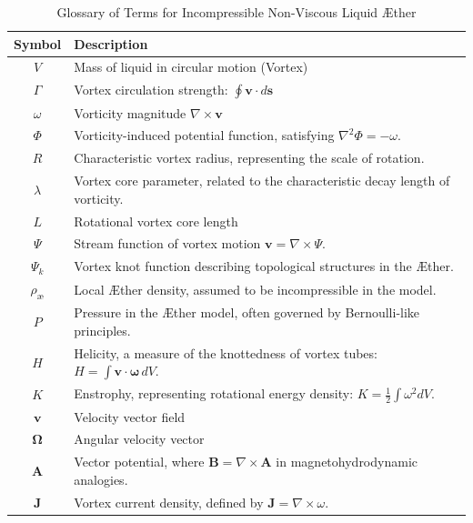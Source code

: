 \documentclass[a4paper,10pt]{article}
\renewcommand{\arraystretch}{1.5}
\begin{document}
    \begin{table}[htbp]
        \centering
        \renewcommand{\arraystretch}{1.0}
        \begin{tabular}{c l}
            \toprule
            Symbol & Description \\
            \midrule
            \( V \) & Mass of liquid in circular motion (Vortex) \\
            \( \Gamma \) & Vortex circulation strength: \( \oint \mathbf{v} \cdot d\mathbf{s} \) \\
            \( \omega \) & Vorticity magnitude \(\nabla \times \mathbf{v} \) \\
            \( \Phi \) & Vorticity-induced potential function, satisfying \( \nabla^2 \Phi = -\omega \). \\
            \( R \) & Characteristic vortex radius, representing the scale of rotation. \\
            \( \lambda \) & Vortex core parameter, related to the characteristic decay length of vorticity. \\
            \( L \) & Rotational vortex core length \\
            \( \Psi \) & Stream function of vortex motion \( \mathbf{v} = \nabla \times \Psi \). \\
            \( \Psi_k \) & Vortex knot function describing topological structures in the Æther. \\
            \( \rho_\text{\ae} \) & Local Æther density, assumed to be incompressible in the model. \\
            \( P \) & Pressure in the Æther model, often governed by Bernoulli-like principles. \\
            \( H \) & Helicity, a measure of the knottedness of vortex tubes: \( H = \int \mathbf{v} \cdot \mathbf{\omega} \, dV \). \\
            \( K \) & Enstrophy, representing rotational energy density: \( K = \frac{1}{2} \int \omega^2 dV \). \\
            \( \mathbf{v} \) & Velocity vector field \\
            \( \mathbf{\Omega} \) & Angular velocity vector \\
            \( \mathbf{A} \) & Vector potential, where \( \mathbf{B} = \nabla \times \mathbf{A} \) in magnetohydrodynamic analogies. \\
            \( \mathbf{J} \) & Vortex current density, defined by \( \mathbf{J} = \nabla \times \omega \). \\
            \bottomrule
        \end{tabular}
        \caption{Glossary of Terms for Incompressible Non-Viscous Liquid Æther}
        \label{tab:symbols}
    \end{table}
\end{document}
